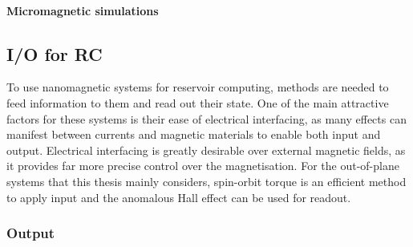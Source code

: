 \paragraph{Micromagnetic simulations}

\subsection{I/O for RC}\label{sec:1:ASI_IO}
To use nanomagnetic systems for reservoir computing, methods are needed to feed information to them and read out their state.
One of the main attractive factors for these systems is their ease of electrical interfacing, as many effects can manifest between currents and magnetic materials to enable both input and output.
Electrical interfacing is greatly desirable over external magnetic fields, as it provides far more precise control over the magnetisation.
For the out-of-plane systems that this thesis mainly considers, spin-orbit torque is an efficient method to apply input and the anomalous Hall effect can be used for readout.

\subsubsection{Output}
